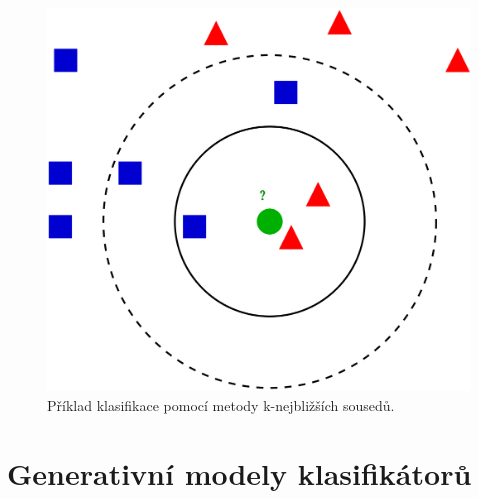 \begin{figure}[H]
    \centering
    \includegraphics[width=0.5\linewidth]{knn_classification.png}
    \caption{Příklad klasifikace pomocí metody k-nejbližších sousedů.}
\end{figure}


\section{Generativní modely klasifikátorů}

